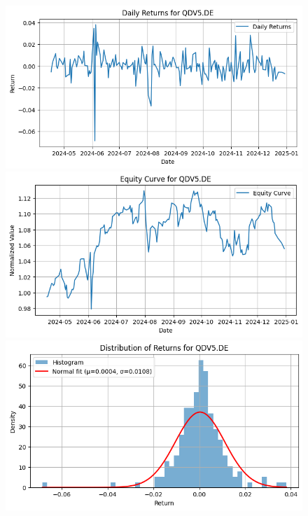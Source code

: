 \documentclass{article}%
\begin{document}
\begin{figure}[htbp]%
\begin{minipage}{0.31\textwidth}%
\includegraphics[width=\linewidth]{ticker_images/QDV5.DE_daily_returns.png}%
\end{minipage}%
\begin{minipage}{0.31\textwidth}%
\includegraphics[width=\linewidth]{ticker_images/QDV5.DE_equity_curve.png}%
\end{minipage}%
\begin{minipage}{0.31\textwidth}%
\includegraphics[width=\linewidth]{ticker_images/QDV5.DE_return_distribution.png}%
\end{minipage}%
\end{figure}
\end{document}
